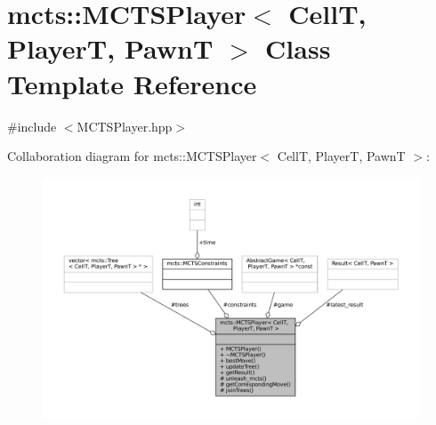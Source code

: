 \hypertarget{classmcts_1_1_m_c_t_s_player}{}\section{mcts\+:\+:M\+C\+T\+S\+Player$<$ CellT, PlayerT, PawnT $>$ Class Template Reference}
\label{classmcts_1_1_m_c_t_s_player}


{\ttfamily \#include $<$M\+C\+T\+S\+Player.\+hpp$>$}



Collaboration diagram for mcts\+:\+:M\+C\+T\+S\+Player$<$ CellT, PlayerT, PawnT $>$\+:
\nopagebreak
\begin{figure}[H]
\begin{center}
\leavevmode
\includegraphics[width=350pt]{classmcts_1_1_m_c_t_s_player__coll__graph}
\end{center}
\end{figure}
